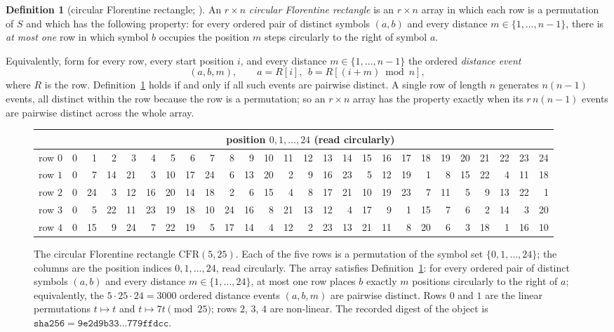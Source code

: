\documentclass[11pt]{amsart}
\theoremstyle{plain}
\theoremstyle{definition}
\newtheorem{definition}[theorem]{Definition}
\theoremstyle{remark}
\begin{document}
\begin{definition}[circular Florentine rectangle; ]
\label{def:cfr}
An $r\times n$ \emph{circular Florentine rectangle} is an $r\times n$ array in
which each row is a permutation of $S$ and which has the following property:
for every ordered pair of distinct symbols $(a,b)$ and every distance
$m\in\{1,\dots,n-1\}$, there is \emph{at most one} row in which symbol $b$
occupies the position $m$ steps circularly to the right of symbol $a$.
\end{definition}

Equivalently, form for every row, every start position $i$, and every distance
$m\in\{1,\dots,n-1\}$ the ordered \emph{distance event}
\[
(a,b,m),\qquad a=R[i],\ \ b=R[(i+m)\bmod n],
\]
where $R$ is the row. Definition~\ref{def:cfr} holds if and only if all such
events are pairwise distinct. A single row of length $n$ generates
$n(n-1)$ events, all distinct within the row because the row is a permutation;
so an $r\times n$ array has the property exactly when its $r\,n(n-1)$ events
are pairwise distinct across the whole array.

\begin{figure}[ht]
\centering
\scriptsize
\setlength{\tabcolsep}{2.6pt}
\renewcommand{\arraystretch}{1.15}
\begin{tabular}{r|*{25}{r}}
\toprule
 & \multicolumn{25}{c}{\scriptsize position $0,1,\dots,24$ (read circularly)}\\
\midrule
row $0$ & 0 & 1 & 2 & 3 & 4 & 5 & 6 & 7 & 8 & 9 & 10 & 11 & 12 & 13 & 14 & 15 & 16 & 17 & 18 & 19 & 20 & 21 & 22 & 23 & 24\\
row $1$ & 0 & 7 & 14 & 21 & 3 & 10 & 17 & 24 & 6 & 13 & 20 & 2 & 9 & 16 & 23 & 5 & 12 & 19 & 1 & 8 & 15 & 22 & 4 & 11 & 18\\
row $2$ & 0 & 24 & 3 & 12 & 16 & 20 & 14 & 18 & 2 & 6 & 15 & 4 & 8 & 17 & 21 & 10 & 19 & 23 & 7 & 11 & 5 & 9 & 13 & 22 & 1\\
row $3$ & 0 & 5 & 22 & 11 & 23 & 19 & 18 & 10 & 24 & 16 & 8 & 21 & 13 & 12 & 4 & 17 & 9 & 1 & 15 & 7 & 6 & 2 & 14 & 3 & 20\\
row $4$ & 0 & 15 & 9 & 24 & 7 & 22 & 19 & 5 & 17 & 14 & 4 & 12 & 2 & 23 & 13 & 21 & 11 & 8 & 20 & 6 & 3 & 18 & 1 & 16 & 10\\
\bottomrule
\end{tabular}
\caption{The circular Florentine rectangle $\mathrm{CFR}(5,25)$. Each of the
five rows is a permutation of the symbol set $\{0,1,\dots,24\}$; the columns
are the position indices $0,1,\dots,24$, read circularly. The array satisfies
Definition~\ref{def:cfr}: for every ordered pair of distinct symbols $(a,b)$
and every distance $m\in\{1,\dots,24\}$, at most one row places $b$ exactly
$m$ positions circularly to the right of $a$; equivalently, the
$5\cdot 25\cdot 24 = 3000$ ordered distance events $(a,b,m)$ are pairwise
distinct. Rows $0$ and $1$ are the linear permutations $t\mapsto t$ and
$t\mapsto 7t\pmod{25}$; rows $2$, $3$, $4$ are non-linear. The recorded
digest of the object is
$\mathtt{sha256}=\mathtt{9e2d9b33\ldots779ffdcc}$.}
\label{fig:cfr}
\end{figure}
\end{document}
